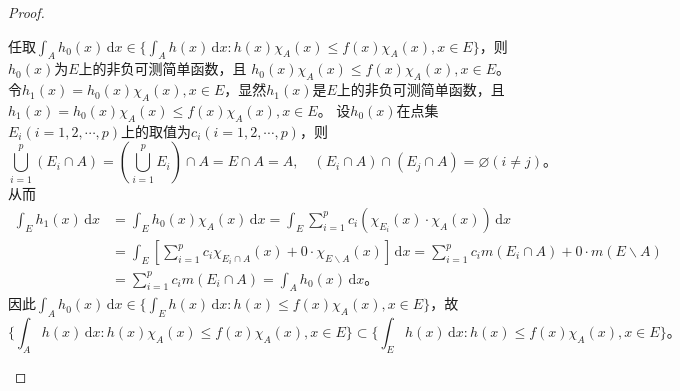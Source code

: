 \documentclass[../../main.tex]{subfiles}%
\begin{document}
\begin{proof}
\begin{enumerate}[(1)]
任取$\int_A h_0(x)\,\mathrm{d}x \in \{\int_A h(x)\,\mathrm{d}x : h(x) \chi_A(x) \leqslant f(x) \chi_A(x), x \in E\}$，则$h_0(x)$为$E$上的非负可测简单函数，且
$h_0(x) \chi_A(x) \leqslant f(x) \chi_A(x), x \in E$。
令$h_1(x) = h_0(x) \chi_A(x), x \in E$，显然$h_1(x)$是$E$上的非负可测简单函数，且
$h_1(x) = h_0(x) \chi_A(x) \leqslant f(x) \chi_A(x), x \in E$。
设$h_0(x)$在点集$E_i (i = 1,2,\cdots,p)$上的取值为$c_i (i = 1,2,\cdots,p)$，则
\[
\bigcup_{i=1}^p (E_i\cap A) = (\bigcup_{i=1}^p E_i) \cap A = E\cap A = A,\quad (E_i\cap A) \cap (E_j\cap A) = \varnothing (i\ne j)。
\]
从而
\begin{align*}
\int_E h_1(x)\,\mathrm{d}x &= \int_E h_0(x) \chi_A(x)\,\mathrm{d}x = \int_E \sum_{i=1}^p c_i (\chi_{E_i}(x) \cdot \chi_A(x))\,\mathrm{d}x \\
&= \int_E \left[ \sum_{i=1}^p c_i \chi_{E_i\cap A}(x) + 0 \cdot \chi_{E\backslash A}(x) \right]\,\mathrm{d}x = \sum_{i=1}^p c_i m(E_i\cap A) + 0 \cdot m(E\backslash A) \\
&= \sum_{i=1}^p c_i m(E_i\cap A) = \int_A h_0(x)\,\mathrm{d}x。
\end{align*}
因此$\int_A h_0(x)\,\mathrm{d}x \in \{\int_E h(x)\,\mathrm{d}x : h(x) \leqslant f(x) \chi_A(x), x \in E\}$，故
\[
\{\int_A h(x)\,\mathrm{d}x : h(x) \chi_A(x) \leqslant f(x) \chi_A(x), x \in E\} \subset \{\int_E h(x)\,\mathrm{d}x : h(x) \leqslant f(x) \chi_A(x), x \in E\}。
\]


\end{enumerate}
\end{proof}
\end{document}
